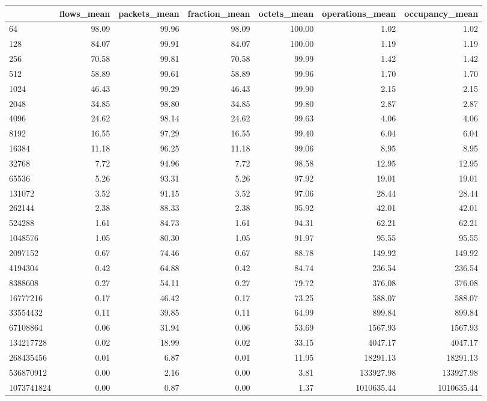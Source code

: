 \begin{tabular}{lrrrrrr}
\toprule
 & flows_mean & packets_mean & fraction_mean & octets_mean & operations_mean & occupancy_mean \\
\midrule
64 & 98.09 & 99.96 & 98.09 & 100.00 & 1.02 & 1.02 \\
128 & 84.07 & 99.91 & 84.07 & 100.00 & 1.19 & 1.19 \\
256 & 70.58 & 99.81 & 70.58 & 99.99 & 1.42 & 1.42 \\
512 & 58.89 & 99.61 & 58.89 & 99.96 & 1.70 & 1.70 \\
1024 & 46.43 & 99.29 & 46.43 & 99.90 & 2.15 & 2.15 \\
2048 & 34.85 & 98.80 & 34.85 & 99.80 & 2.87 & 2.87 \\
4096 & 24.62 & 98.14 & 24.62 & 99.63 & 4.06 & 4.06 \\
8192 & 16.55 & 97.29 & 16.55 & 99.40 & 6.04 & 6.04 \\
16384 & 11.18 & 96.25 & 11.18 & 99.06 & 8.95 & 8.95 \\
32768 & 7.72 & 94.96 & 7.72 & 98.58 & 12.95 & 12.95 \\
65536 & 5.26 & 93.31 & 5.26 & 97.92 & 19.01 & 19.01 \\
131072 & 3.52 & 91.15 & 3.52 & 97.06 & 28.44 & 28.44 \\
262144 & 2.38 & 88.33 & 2.38 & 95.92 & 42.01 & 42.01 \\
524288 & 1.61 & 84.73 & 1.61 & 94.31 & 62.21 & 62.21 \\
1048576 & 1.05 & 80.30 & 1.05 & 91.97 & 95.55 & 95.55 \\
2097152 & 0.67 & 74.46 & 0.67 & 88.78 & 149.92 & 149.92 \\
4194304 & 0.42 & 64.88 & 0.42 & 84.74 & 236.54 & 236.54 \\
8388608 & 0.27 & 54.11 & 0.27 & 79.72 & 376.08 & 376.08 \\
16777216 & 0.17 & 46.42 & 0.17 & 73.25 & 588.07 & 588.07 \\
33554432 & 0.11 & 39.85 & 0.11 & 64.99 & 899.84 & 899.84 \\
67108864 & 0.06 & 31.94 & 0.06 & 53.69 & 1567.93 & 1567.93 \\
134217728 & 0.02 & 18.99 & 0.02 & 33.15 & 4047.17 & 4047.17 \\
268435456 & 0.01 & 6.87 & 0.01 & 11.95 & 18291.13 & 18291.13 \\
536870912 & 0.00 & 2.16 & 0.00 & 3.81 & 133927.98 & 133927.98 \\
1073741824 & 0.00 & 0.87 & 0.00 & 1.37 & 1010635.44 & 1010635.44 \\
\bottomrule
\end{tabular}

